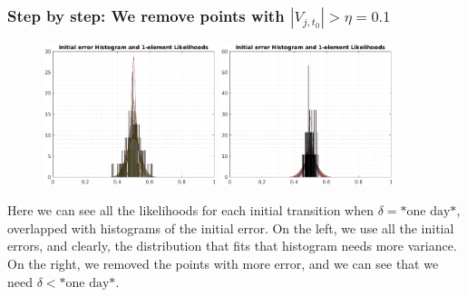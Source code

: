\documentclass[aspectratio=169]{beamer}\usepackage[utf8]{inputenc}
\begin{document}
\begin{frame}\frametitle{Step by step: We remove points with $|V_{j,t_0}|>\eta=0.1$}

\begin{figure}[ht!]
\centering
\includegraphics[width=0.45\textwidth]{../../MATLAB_Files/Results/delta/allLH_0.eps}
\includegraphics[width=0.45\textwidth]{../../MATLAB_Files/Results/delta/allLH_1.eps}
\end{figure}
{\small
Here we can see all the likelihoods for each initial transition when $\delta=\text{*one day*}$, overlapped with histograms of the initial error. On the left, we use all the initial errors, and clearly, the distribution that fits that histogram needs more variance. On the right, we removed the points with more error, and we can see that we need $\delta<\text{*one day*}$.}
\end{frame}
\end{document}
